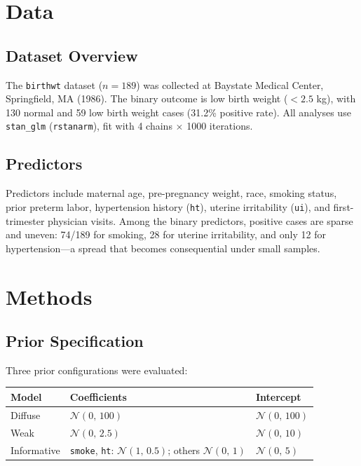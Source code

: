 \documentclass[11pt]{article}
\begin{document}
\section{Data}

\subsection{Dataset Overview}

The \texttt{birthwt} dataset ($n = 189$) was collected at Baystate
Medical Center, Springfield, MA (1986).
The binary outcome is low birth weight ($< 2.5$ kg), with 130 normal
and 59 low birth weight cases (31.2\% positive rate).
All analyses use \texttt{stan\_glm} (\texttt{rstanarm}), fit with
4 chains $\times$ 1000 iterations.

\subsection{Predictors}

Predictors include maternal age, pre-pregnancy weight, race,
smoking status, prior preterm labor, hypertension history (\texttt{ht}),
uterine irritability (\texttt{ui}), and first-trimester physician visits.
Among the binary predictors, positive cases are sparse and uneven:
74/189 for smoking, 28 for uterine irritability, and only 12 for
hypertension---a spread that becomes consequential under small samples.

\section{Methods}

\subsection{Prior Specification}

Three prior configurations were evaluated:

\begin{center}
\begin{tabular}{lll}
\toprule
Model & Coefficients & Intercept \\
\midrule
Diffuse      & $\mathcal{N}(0,\,100)$
             & $\mathcal{N}(0,\,100)$ \\
Weak         & $\mathcal{N}(0,\,2.5)$
             & $\mathcal{N}(0,\,10)$  \\
Informative  & \texttt{smoke}, \texttt{ht}: $\mathcal{N}(1,\,0.5)$;
               others $\mathcal{N}(0,\,1)$
             & $\mathcal{N}(0,\,5)$   \\
\bottomrule
\end{tabular}
\end{center}
\end{document}
